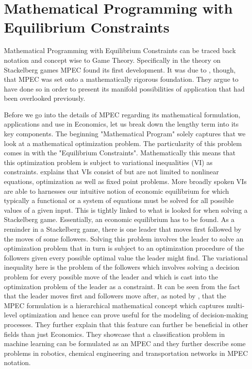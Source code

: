\section{Mathematical Programming with Equilibrium Constraints}
\thispagestyle{plain} %

Mathematical Programming with Equilibrium Constraints can be traced back notation and concept wise to Game Theory. Specifically in the theory on Stackelberg games MPEC found its first development. It was due to \cite{Luo.Pang.Ralph.1996}, though, that MPEC was set onto a mathematically rigorous foundation. They argue to have done so in order to present its manifold possibilities of application that had been overlooked previously. 

Before we go into the details of MPEC regarding its mathematical formulation, applications and use in Economics, let us break down the lengthy term into its key components. The beginning "Mathematical Program" solely captures that we look at a mathematical optimization problem. The particularity of this problem comes in with the "Equilibrium Constraints". Mathematically this means that this optimization problem is subject to variational inequalities (VI) as constraints. \cite{Nagurney.1993} explains that VIs consist of but are not limited to nonlinear equations, optimization as well as fixed point problems. More broadly spoken VIs are able to harnesses our intuitive notion of economic equilibrium for which typically a functional or a system of equations must be solved for all possible values of a given input. This is tightly linked to what is looked for when solving a Stackelberg game. Essentially, an economic equilibrium has to be found. As a reminder in a Stackelberg game, there is one leader that moves first followed by the moves of some followers. Solving this problem involves the leader to solve an optimization problem that in turn is subject to an optimization procedure of the followers given every possible optimal value the leader might find. The variational inequality here is the problem of the followers which involves solving a decision problem for every possible move of the leader and which is cast into the optimization problem of the leader as a constraint. It can be seen from the fact that the leader moves first and followers move after, as noted by \cite{Luo.Pang.Ralph.1996}, that the MPEC formulation is a hierarchical mathematical concept which captures multi-level optimization and hence can prove useful for the modeling of decision-making processes. They further explain that this feature can further be beneficial in other fields than just Economics. They showcase that a classification problem in machine learning can be formulated as an MPEC and they further describe some problems in robotics, chemical engineering and transportation networks in MPEC notation. 

